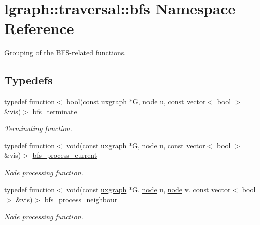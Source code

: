 \hypertarget{namespacelgraph_1_1traversal_1_1bfs}{}\section{lgraph\+:\+:traversal\+:\+:bfs Namespace Reference}
\label{namespacelgraph_1_1traversal_1_1bfs}


Grouping of the B\+F\+S-\/related functions.  


\subsection*{Typedefs}
\begin{DoxyCompactItemize}
\item 
typedef function$<$ bool(const \hyperlink{classlgraph_1_1utils_1_1uxgraph}{uxgraph} $\ast$G, \hyperlink{namespacelgraph_1_1utils_ab9c6b34241f0b68372c55f34c460e863}{node} u, const vector$<$ bool $>$ \&vis)$>$ \hyperlink{namespacelgraph_1_1traversal_1_1bfs_a2622d8419e685b0a28b9ad70ca6c1565}{bfs\+\_\+terminate}
\begin{DoxyCompactList}\small\item\em Terminating function. \end{DoxyCompactList}\item 
typedef function$<$ void(const \hyperlink{classlgraph_1_1utils_1_1uxgraph}{uxgraph} $\ast$G, \hyperlink{namespacelgraph_1_1utils_ab9c6b34241f0b68372c55f34c460e863}{node} u, const vector$<$ bool $>$ \&vis)$>$ \hyperlink{namespacelgraph_1_1traversal_1_1bfs_a5a37d7fee20d8b473826d3599ada96b7}{bfs\+\_\+process\+\_\+current}
\begin{DoxyCompactList}\small\item\em Node processing function. \end{DoxyCompactList}\item 
typedef function$<$ void(const \hyperlink{classlgraph_1_1utils_1_1uxgraph}{uxgraph} $\ast$G, \hyperlink{namespacelgraph_1_1utils_ab9c6b34241f0b68372c55f34c460e863}{node} u, \hyperlink{namespacelgraph_1_1utils_ab9c6b34241f0b68372c55f34c460e863}{node} v, const vector$<$ bool $>$ \&vis)$>$ \hyperlink{namespacelgraph_1_1traversal_1_1bfs_ab8c86ff87736f713c845b61ac6a0a956}{bfs\+\_\+process\+\_\+neighbour}
\begin{DoxyCompactList}\small\item\em Node processing function. \end{DoxyCompactList}\end{DoxyCompactItemize}
